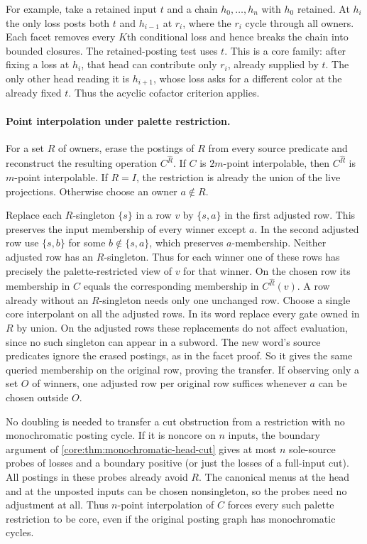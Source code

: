 For example, take a retained input $t$ and a chain
$h_0,\ldots,h_n$ with $h_0$ retained. At $h_i$
the only loss posts both $t$ and $h_{i-1}$ at
$r_i$, where the $r_i$ cycle through all owners.
Each facet removes every $K$th conditional loss
and hence breaks the chain into bounded closures.
The retained-posting test uses $t$. This is a
core family: after fixing a loss at $h_i$, that
head can contribute only $r_i$, already supplied
by $t$. The only other head reading it is $h_{i+1}$,
whose loss asks for a different color at the
already fixed $t$. Thus the acyclic cofactor
criterion applies.

\paragraph{Point interpolation under palette restriction.}
For a set $R$ of owners, erase the postings of $R$
from every source predicate and reconstruct the resulting
operation $C^{\widehat R}$. If $C$ is $2m$-point
interpolable, then $C^{\widehat R}$ is $m$-point
interpolable. If $R=I$, the restriction is already
the union of the live projections. Otherwise choose
an owner $a\notin R$.

Replace each $R$-singleton $\{s\}$ in a row $v$ by
$\{s,a\}$ in the first adjusted row. This preserves
the input membership of every winner except $a$.
In the second adjusted row use $\{s,b\}$ for some
$b\notin\{s,a\}$, which preserves $a$-membership.
Neither adjusted row has an $R$-singleton. Thus for
each winner one of these rows has precisely the
palette-restricted view of $v$ for that winner.
On the chosen row its membership in $C$ equals the
corresponding membership in $C^{\widehat R}(v)$.
A row already without an $R$-singleton needs only
one unchanged row.
Choose a single core interpolant on all the adjusted
rows. In its word replace every gate owned in $R$ by
union. On the adjusted rows these replacements do
not affect evaluation, since no such singleton can
appear in a subword. The new word's source predicates
ignore the erased postings, as in the facet proof.
So it gives the same queried membership on the original
row, proving the transfer. If observing only a set $O$
of winners, one adjusted row per original row suffices
whenever $a$ can be chosen outside $O$.

No doubling is needed to transfer a cut obstruction
from a restriction with no monochromatic posting cycle.
If it is noncore on $n$ inputs, the boundary argument of
\cref{core:thm:monochromatic-head-cut} gives at most $n$
sole-source probes of losses and a boundary positive
(or just the losses of a full-input cut). All postings
in these probes already avoid $R$. The canonical menus
at the head and at the unposted inputs can be chosen
nonsingleton, so the probes need no adjustment at all.
Thus $n$-point interpolation of $C$ forces every such
palette restriction to be core, even if the original
posting graph has monochromatic cycles.

